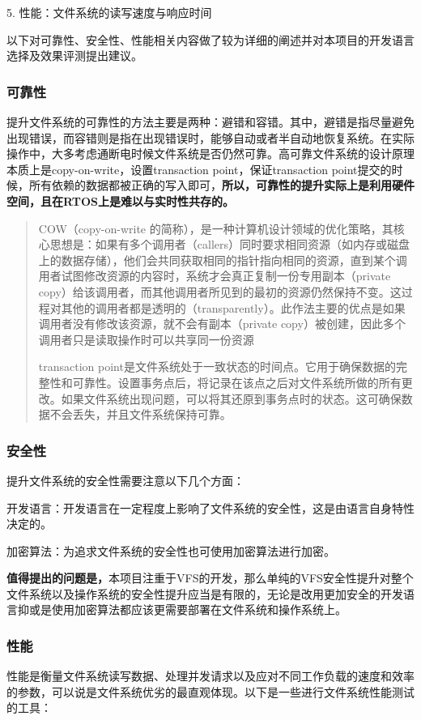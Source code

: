 \documentclass[UTF8,a4paper]{ctexart}
\begin{document}
	5. 性能：文件系统的读写速度与响应时间
	
	以下对可靠性、安全性、性能相关内容做了较为详细的阐述并对本项目的开发语言选择及效果评测提出建议。
	\subsubsection{可靠性}
	提升文件系统的可靠性的方法主要是两种：避错和容错。其中，避错是指尽量避免出现错误，而容错则是指在出现错误时，能够自动或者半自动地恢复系统。在实际操作中，大多考虑通断电时候文件系统是否仍然可靠。高可靠文件系统的设计原理本质上是copy-on-write，设置transaction point，保证transaction point提交的时候，所有依赖的数据都被正确的写入即可，\textbf{所以，可靠性的提升实际上是利用硬件空间，且在RTOS上是难以与实时性共存的。}
	\begin{quote}
		\songti
		COW（copy-on-write 的简称），是一种计算机设计领域的优化策略，其核心思想是：如果有多个调用者（callers）同时要求相同资源（如内存或磁盘上的数据存储），他们会共同获取相同的指针指向相同的资源，直到某个调用者试图修改资源的内容时，系统才会真正复制一份专用副本（private copy）给该调用者，而其他调用者所见到的最初的资源仍然保持不变。这过程对其他的调用者都是透明的（transparently）。此作法主要的优点是如果调用者没有修改该资源，就不会有副本（private copy）被创建，因此多个调用者只是读取操作时可以共享同一份资源
		
		transaction point是文件系统处于一致状态的时间点。它用于确保数据的完整性和可靠性。设置事务点后，将记录在该点之后对文件系统所做的所有更改。如果文件系统出现问题，可以将其还原到事务点时的状态。这可确保数据不会丢失，并且文件系统保持可靠。
	\end{quote}
	
	\subsubsection{安全性}
	提升文件系统的安全性需要注意以下几个方面：
	
	开发语言：开发语言在一定程度上影响了文件系统的安全性，这是由语言自身特性决定的。
	
	加密算法：为追求文件系统的安全性也可使用加密算法进行加密。
	
	\textbf{值得提出的问题是，}本项目注重于VFS的开发，那么单纯的VFS安全性提升对整个文件系统以及操作系统的安全性提升应当是有限的，无论是改用更加安全的开发语言抑或是使用加密算法都应该更需要部署在文件系统和操作系统上。
	\subsubsection{性能}
	性能是衡量文件系统读写数据、处理并发请求以及应对不同工作负载的速度和效率的参数，可以说是文件系统优劣的最直观体现。以下是一些进行文件系统性能测试的工具：
	
\end{document}
